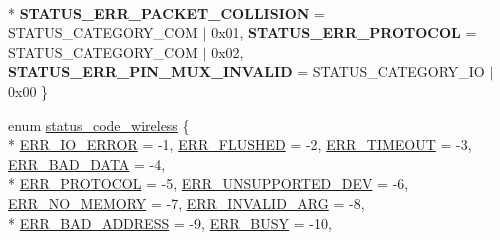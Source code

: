 \begin{DoxyCompactItemize}
\\*
{\bfseries S\+T\+A\+T\+U\+S\+\_\+\+E\+R\+R\+\_\+\+P\+A\+C\+K\+E\+T\+\_\+\+C\+O\+L\+L\+I\+S\+I\+O\+N} = S\+T\+A\+T\+U\+S\+\_\+\+C\+A\+T\+E\+G\+O\+R\+Y\+\_\+\+C\+O\+M $\vert$ 0x01, 
{\bfseries S\+T\+A\+T\+U\+S\+\_\+\+E\+R\+R\+\_\+\+P\+R\+O\+T\+O\+C\+O\+L} = S\+T\+A\+T\+U\+S\+\_\+\+C\+A\+T\+E\+G\+O\+R\+Y\+\_\+\+C\+O\+M $\vert$ 0x02, 
{\bfseries S\+T\+A\+T\+U\+S\+\_\+\+E\+R\+R\+\_\+\+P\+I\+N\+\_\+\+M\+U\+X\+\_\+\+I\+N\+V\+A\+L\+I\+D} = S\+T\+A\+T\+U\+S\+\_\+\+C\+A\+T\+E\+G\+O\+R\+Y\+\_\+\+I\+O $\vert$ 0x00
 \}
\item 
enum \hyperlink{group__group__sam0__utils__status__codes_ga29235ed38b6f02861f29daae665ac3a2}{status\+\_\+code\+\_\+wireless} \{ \\*
\hyperlink{group__group__sam0__utils__status__codes_gga29235ed38b6f02861f29daae665ac3a2a0162f46cd42e6d3332b79c7284bcfcde}{E\+R\+R\+\_\+\+I\+O\+\_\+\+E\+R\+R\+O\+R} = -\/1, 
\hyperlink{group__group__sam0__utils__status__codes_gga29235ed38b6f02861f29daae665ac3a2a9d415cac501d1e51b419985ef8644e7f}{E\+R\+R\+\_\+\+F\+L\+U\+S\+H\+E\+D} = -\/2, 
\hyperlink{group__group__sam0__utils__status__codes_gga29235ed38b6f02861f29daae665ac3a2ac568baeb6407ef5e2630084ccbc34be8}{E\+R\+R\+\_\+\+T\+I\+M\+E\+O\+U\+T} = -\/3, 
\hyperlink{group__group__sam0__utils__status__codes_gga29235ed38b6f02861f29daae665ac3a2a7aee3b5c2b62ef9de286635fc4d0ed44}{E\+R\+R\+\_\+\+B\+A\+D\+\_\+\+D\+A\+T\+A} = -\/4, 
\\*
\hyperlink{group__group__sam0__utils__status__codes_gga29235ed38b6f02861f29daae665ac3a2ace90946755daec754646e5f528ce1dcf}{E\+R\+R\+\_\+\+P\+R\+O\+T\+O\+C\+O\+L} = -\/5, 
\hyperlink{group__group__sam0__utils__status__codes_gga29235ed38b6f02861f29daae665ac3a2ab83b44cb6a1972de125f0f2efd45260e}{E\+R\+R\+\_\+\+U\+N\+S\+U\+P\+P\+O\+R\+T\+E\+D\+\_\+\+D\+E\+V} = -\/6, 
\hyperlink{group__group__sam0__utils__status__codes_gga29235ed38b6f02861f29daae665ac3a2a308199736159a4f167ad4f58db8a3830}{E\+R\+R\+\_\+\+N\+O\+\_\+\+M\+E\+M\+O\+R\+Y} = -\/7, 
\hyperlink{group__group__sam0__utils__status__codes_gga29235ed38b6f02861f29daae665ac3a2a70aa759d292a0e4be7123d01959357da}{E\+R\+R\+\_\+\+I\+N\+V\+A\+L\+I\+D\+\_\+\+A\+R\+G} = -\/8, 
\\*
\hyperlink{group__group__sam0__utils__status__codes_gga29235ed38b6f02861f29daae665ac3a2ab7f7c844a2381a5b981a5e3d4a13ee17}{E\+R\+R\+\_\+\+B\+A\+D\+\_\+\+A\+D\+D\+R\+E\+S\+S} = -\/9, 
\hyperlink{group__group__sam0__utils__status__codes_gga29235ed38b6f02861f29daae665ac3a2a8d4f409eda53a10f049dc6d5a833ccba}{E\+R\+R\+\_\+\+B\+U\+S\+Y} = -\/10, 

\end{DoxyCompactItemize}
